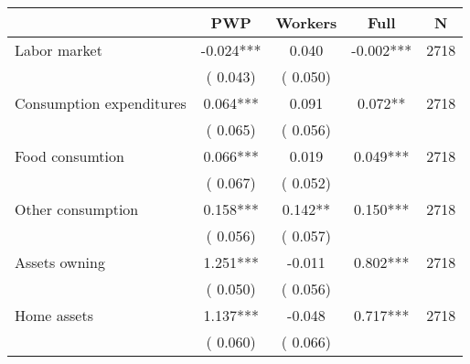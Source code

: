 
\begin{tabular}{l*{4}{c}}\hline&\multicolumn{1}{c}{PWP}&\multicolumn{1}{c}{Workers}&\multicolumn{1}{c}{Full}&\multicolumn{1}{c}{N} \\ \hline

 Labor market &             -0.024*** &         0.040 &          -0.002*** & 2718                       \\  
                 &        (       0.043)                   &        (       0.050)                        &                                                             &                                                      \\      

 Consumption expenditures &              0.064*** &         0.091 &           0.072** & 2718                       \\  
                 &        (       0.065)                   &        (       0.056)                        &                                                             &                                                      \\      

 Food consumtion &              0.066*** &         0.019 &           0.049*** & 2718                       \\  
                 &        (       0.067)                   &        (       0.052)                        &                                                             &                                                      \\      

 Other consumption &              0.158*** &         0.142** &           0.150*** & 2718                       \\  
                 &        (       0.056)                   &        (       0.057)                        &                                                             &                                                      \\      

 Assets owning &              1.251*** &        -0.011 &           0.802*** & 2718                       \\  
                 &        (       0.050)                   &        (       0.056)                        &                                                             &                                                      \\      

 Home assets &              1.137*** &        -0.048 &           0.717*** & 2718                       \\  
                 &        (       0.060)                   &        (       0.066)                        &                                                             &                                                      \\      


\end{tabular}
